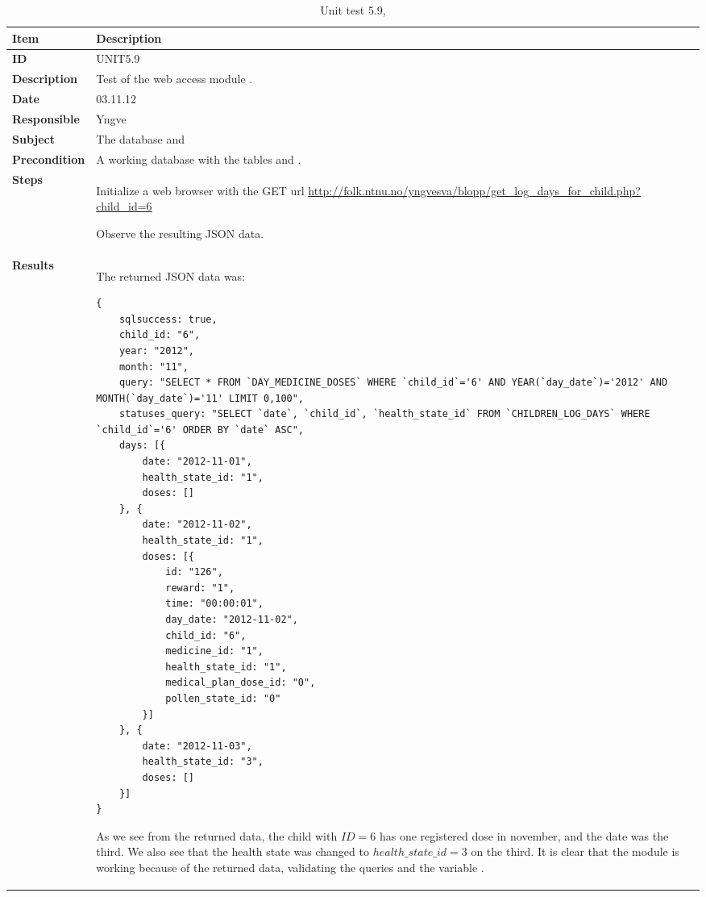 \begin{table} %
	\begin{center}
		\begin{tabular}{|p{3.0cm}|p{14.1cm}|}
			\hline
			\bf{Item} & \bf{Description}\\
			\hline
			\bf{ID} & UNIT5.9\\
			\bf{Description} & Test of the web access module \code{get\_log\_days\_for\_child.php}.\\
			\bf{Date} & 03.11.12\\
			\bf{Responsible} & Yngve\\
			\bf{Subject} & The database and \code{get\_log\_days\_for\_child.php}\\
			\bf{Precondition} & A working database with the tables \code{DAY\_MEDICINE\_DOSES} and \code{CHILDREN\_LOG\_DAYS}.\\
			\bf{Steps} &
			\begin{tabulenum}
				\item Initialize a web browser with the GET url \url{http://folk.ntnu.no/yngvesva/blopp/get\_log\_days\_for\_child.php?child\_id=6}
				\item Observe the resulting JSON data.
			\end{tabulenum}\\
			\hline
			\bf{Results} & The returned JSON data was:
\begin{lstlisting}[caption=Returned JSON data for \code{get\_log\_days\_for\_child.php}]
{
    sqlsuccess: true,
    child_id: "6",
    year: "2012",
    month: "11",
    query: "SELECT * FROM `DAY_MEDICINE_DOSES` WHERE `child_id`='6' AND YEAR(`day_date`)='2012' AND MONTH(`day_date`)='11' LIMIT 0,100",
    statuses_query: "SELECT `date`, `child_id`, `health_state_id` FROM `CHILDREN_LOG_DAYS` WHERE `child_id`='6' ORDER BY `date` ASC",
    days: [{
        date: "2012-11-01",
        health_state_id: "1",
        doses: []
    }, {
        date: "2012-11-02",
        health_state_id: "1",
        doses: [{
            id: "126",
            reward: "1",
            time: "00:00:01",
            day_date: "2012-11-02",
            child_id: "6",
            medicine_id: "1",
            health_state_id: "1",
            medical_plan_dose_id: "0",
            pollen_state_id: "0"
        }]
    }, {
        date: "2012-11-03",
        health_state_id: "3",
        doses: []
    }]
}
\end{lstlisting}
			As we see from the returned data, the child with $ID=6$ has one registered dose 
			in november, and the date was the third. We also see that the health state was
			changed to $health\_state\_id=3$ on the third. It is clear that the module is
			working because of the returned data, validating the queries and the variable
			\code{sqlsuccess}. 
			\\
			\hline
		\end{tabular}
	\end{center}
	\caption{Unit test 5.9, }
	\label{tab:unit5.9}
\end{table}

